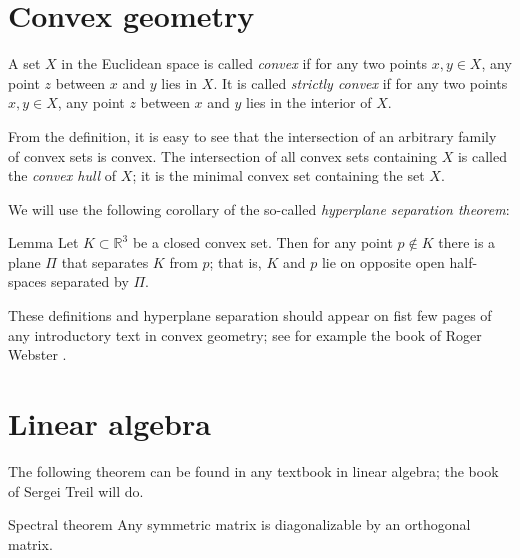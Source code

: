 \section{Convex geometry}

A set $X$ in the Euclidean space is called \emph{convex} if for any two points $x,y\in X$, any point $z$ between $x$ and $y$ lies in $X$.
It is called  {}\emph{strictly convex} if for any two points $x,y\in X$, any point $z$ between $x$ and $y$ lies in the interior of $X$.

From the definition, it is easy to see that the intersection of an arbitrary family of convex sets is convex. 
The intersection of all convex sets containing $X$ is called the \emph{convex hull} of $X$;
it is the minimal convex set containing the set $X$.

We will use the following corollary of the so-called \emph{hyperplane separation theorem}:

\begin{thm}{Lemma}\label{lem:separation}
Let $K\subset \mathbb{R}^3$ be a closed convex set.
Then for any point $p\notin K$ there is a plane $\Pi$ that separates $K$ from $p$;
that is, $K$ and $p$ lie on opposite open half-spaces separated by $\Pi$.
\end{thm}

These definitions and hyperplane separation should appear on fist few pages of any introductory text in convex geometry;
see for example the book of Roger Webster \cite{webster}.

\section{Linear algebra}

The following theorem can be found in any textbook in linear algebra;
the book of Sergei Treil \cite{treil} will do.

\begin{thm}{Spectral theorem}\label{thm:spectral}
Any symmetric matrix is diagonalizable  by an orthogonal matrix.
\end{thm}

